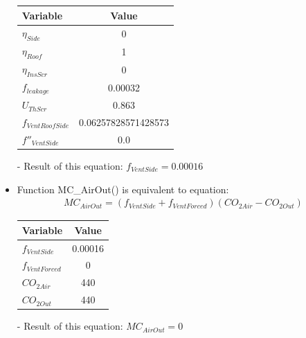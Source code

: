 \documentclass[a4paper]{article}
\numberwithin{equation}{section}
\begin{document}
\begin{itemize}
        \begin{table}[H]
          \centering
          \begin{tabular}{@{}lS[table-format=1.17]@{}}
            \toprule
            \textbf{Variable}    & \textbf{Value}      \\
            \midrule
            \(\eta_{Side}\)      & 0                   \\
            \(\eta_{Roof}\)      & 1                   \\
            \(\eta_{InsScr}\)    & 0                   \\
            \(f_{leakage}\)      & 0.00032             \\
            \(U_{ThScr}\)        & 0.863               \\
            \(f_{VentRoofSide}\) & 0.06257828571428573 \\
            \(f''_{VentSide}\)   & 0.0                 \\
            \bottomrule
          \end{tabular}
        \end{table}

  \item[-] Result of this equation: \(f_{VentSide} = 0.00016\)

  \item Function MC\_AirOut() is equivalent to equation:
        \begin{align*}
          MC_{AirOut} = (f_{VentSide} + f_{VentForced})(CO_{2 Air} - CO_{2 Out})
        \end{align*}

        \begin{table}[H]
          \centering
          \begin{tabular}{@{}lS@{}}
            \toprule
            \textbf{Variable}  & \textbf{Value} \\
            \midrule
            \(f_{VentSide}\)   & 0.00016        \\
            \(f_{VentForced}\) & 0              \\
            \(CO_{2 Air}\)     & 440            \\
            \(CO_{2 Out}\)     & 440            \\
            \bottomrule
          \end{tabular}
        \end{table}

  \item[-] Result of this equation: \( MC_{AirOut} = 0 \)


\end{itemize}
\end{document}
